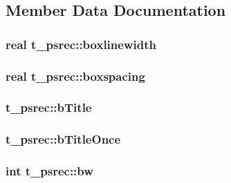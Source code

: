 \subsection{\-Member \-Data \-Documentation}
\hypertarget{structt__psrec_aa683d1388c57b2895ab07e0e7909d78a}{
\subsubsection[{boxlinewidth}]{\setlength{\rightskip}{0pt plus 5cm}real {\bf t\-\_\-psrec\-::boxlinewidth}}}\label{structt__psrec_aa683d1388c57b2895ab07e0e7909d78a}
\hypertarget{structt__psrec_aaf2f5a7157cd6e5d40649608581532aa}{
\subsubsection[{boxspacing}]{\setlength{\rightskip}{0pt plus 5cm}real {\bf t\-\_\-psrec\-::boxspacing}}}\label{structt__psrec_aaf2f5a7157cd6e5d40649608581532aa}
\hypertarget{structt__psrec_a3c06586ca7c50521a46f7e0d9c65175c}{
\subsubsection[{b\-Title}]{ {\bf t\-\_\-psrec\-::b\-Title}}}\label{structt__psrec_a3c06586ca7c50521a46f7e0d9c65175c}
\hypertarget{structt__psrec_aeca0912cf28236e8563f0fa8243b85b2}{
\subsubsection[{b\-Title\-Once}]{ {\bf t\-\_\-psrec\-::b\-Title\-Once}}}\label{structt__psrec_aeca0912cf28236e8563f0fa8243b85b2}
\hypertarget{structt__psrec_aa68e14d942a32a55ed8462479616160c}{
\subsubsection[{bw}]{\setlength{\rightskip}{0pt plus 5cm}int {\bf t\-\_\-psrec\-::bw}}}\label{structt__psrec_aa68e14d942a32a55ed8462479616160c}
